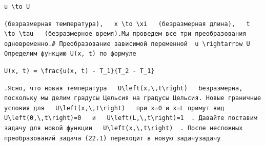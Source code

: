 \documentclass[
  ukrainian,
]{article}
\begin{document}
\begin{verbatim}
u \to U
\end{verbatim}

\begin{verbatim}
(безразмерная температура),   x \to \xi   (безразмерная длина),   t \to \tau   (безразмерное время).Мы проведем все три преобразования одновременно.# Преобразование зависимой переменной  u \rightarrow U  Определим функцию U(x, t) по формуле
\end{verbatim}

\begin{verbatim}
U(x, t) = \frac{u(x, t) - T_1}{T_2 - T_1}
\end{verbatim}

\begin{verbatim}
.Ясно, что новая температура   U\left(x,\,t\right)   безразмерна, поскольку мы делим градусы Цельсия на градусы Цельсия. Новые граничные условия для   U\left(x,\,t\right)   при x=0 и x=L примут вид   U\left(0,\,t\right)=0   и   U\left(L,\,t\right)=1  . Давайте поставим задачу для новой функции   U\left(x,\,t\right)  . После несложных преобразований задача (22.1) переходит в новую задачузадачу
\end{verbatim}
\end{document}
